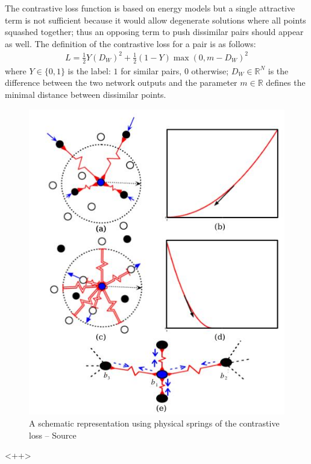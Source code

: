 \documentclass[a4paper,12pt]{report}
\newcommand{\R}{\mathbb{R}}
\begin{document}
The contrastive loss function is based on energy models but a single attractive term is not sufficient because it would allow degenerate solutions where all points squashed together; thus an opposing term to push dissimilar pairs should appear as well.
The definition of the contrastive loss for a pair is as follows:
\begin{eqnarray}
    L = \frac{1}{2} Y (D_W)^2 + \frac{1}{2} (1-Y) \max(0, m - D_W)^2
\end{eqnarray}
where $Y \in \{0,1\}$ is the label: $1$ for similar pairs, $0$ otherwise; $D_W \in \R^N$ is the difference between the two network outputs and the parameter $m \in \R$ defines the minimal distance between dissimilar points.

\begin{figure}[h]
    \begin{center}
        \includegraphics{thesis_figures/contrastive_spring.jpg}
    \end{center}
    \caption{A schematic representation using physical springs of the contrastive loss -- Source \cite{hadsell2006dimensionality}}
    \label{fig:contrastive_spring}
\end{figure}<++>
\end{document}
